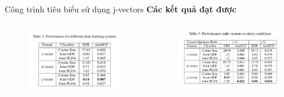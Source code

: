 \documentclass[notheorems, aspectratio=54]{beamer}
\begin{document}
\begin{frame}{Công trình tiêu biểu sử dụng j-vectors}
	\textbf{Các kết quả đạt được}
	\begin{columns}
		\begin{column}{0.5\textwidth}
			\begin{figure}[H]
				\includegraphics[width=1\linewidth]{images/j-vectors-result-table-02.png}
			\end{figure}
		\end{column}
		\begin{column}{0.5\textwidth}
			\begin{figure}[H]
				\includegraphics[width=1\linewidth]{images/j-vectors-result-table-03.png}
		\end{figure}
		\end{column}
	\end{columns}
\end{frame}
\end{document}
